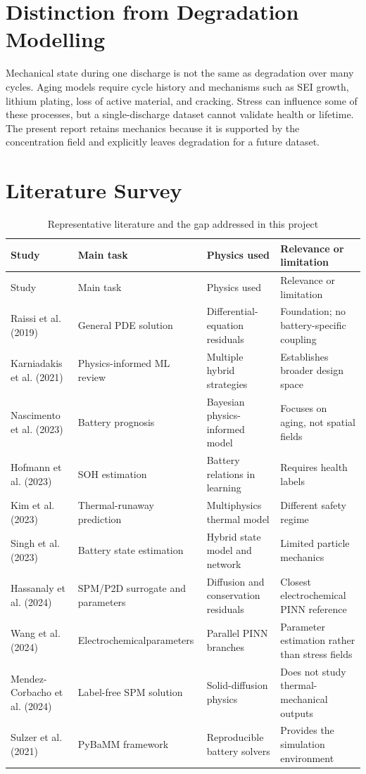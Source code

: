 \documentclass[14pt,a4paper,oneside]{extreport}
\begin{document}
\section{Distinction from Degradation Modelling}
Mechanical state during one discharge is not the same as degradation over many cycles. Aging models require cycle history and mechanisms such as SEI growth, lithium plating, loss of active material, and cracking. Stress can influence some of these processes, but a single-discharge dataset cannot validate health or lifetime. The present report retains mechanics because it is supported by the concentration field and explicitly leaves degradation for a future dataset.

\section{Literature Survey}
\begin{longtable}{@{}>{\RaggedRight\arraybackslash}p{}>{\RaggedRight\arraybackslash}p{}>{\RaggedRight\arraybackslash}p{}>{\RaggedRight\arraybackslash}p{}@{}}
\caption{Representative literature and the gap addressed in this project}\\
\toprule
Study & Main task & Physics used & Relevance or limitation\\
\midrule
\endfirsthead
\toprule
Study & Main task & Physics used & Relevance or limitation\\
\midrule
\endhead
Raissi et al. (2019) & General PDE solution & Differential-equation residuals & Foundation; no battery-specific coupling\\
Karniadakis et al. (2021) & Physics-informed ML review & Multiple hybrid strategies & Establishes broader design space\\
Nascimento et al. (2023) & Battery prognosis & Bayesian physics-informed model & Focuses on aging, not spatial fields\\
Hofmann et al. (2023) & SOH estimation & Battery relations in learning & Requires health labels\\
Kim et al. (2023) & Thermal-runaway prediction & Multiphysics thermal model & Different safety regime\\
Singh et al. (2023) & Battery state estimation & Hybrid state model and network & Limited particle mechanics\\
Hassanaly et al. (2024) & SPM/P2D surrogate and parameters & Diffusion and conservation residuals & Closest electrochemical PINN reference\\
Wang et al. (2024) & Electrochemical\newline parameters & Parallel PINN branches & Parameter estimation rather than stress fields\\
Mendez-Corbacho et al. (2024) & Label-free SPM solution & Solid-diffusion physics & Does not study thermal-mechanical outputs\\
Sulzer et al. (2021) & PyBaMM framework & Reproducible battery solvers & Provides the simulation environment\\
\bottomrule
\end{longtable}
\end{document}
